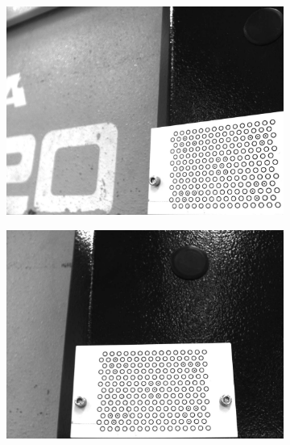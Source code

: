 \begin{figure}[h]
\begin{subfigure}{0.32\textwidth}
        \centering
        \includegraphics[width=\textwidth]{figures/001calibration/calibration4.png}
    \end{subfigure}
    \begin{subfigure}{0.32\textwidth}
        \centering
        \includegraphics[width=\textwidth]{figures/001calibration/calibration5.PNG}
    \end{subfigure}
    \begin{subfigure}{0.32\textwidth}
        \centering

\end{subfigure}
\end{figure}
